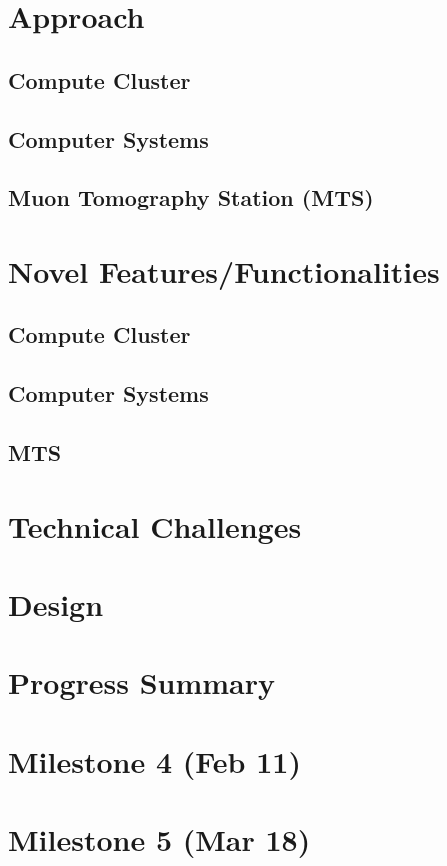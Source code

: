 \documentclass[12pt]{article}
\begin{document}
\section{Approach}
\subsection{Compute Cluster}
\subsection{Computer Systems}
\subsection{Muon Tomography Station (MTS)}

\section{Novel Features/Functionalities}
\subsection{Compute Cluster}
\subsection{Computer Systems}
\subsection{MTS}

\section{Technical Challenges}

\section{Design}

\section{Progress Summary}

\section{Milestone 4 (Feb 11)}

\section{Milestone 5 (Mar 18)}
\end{document}
